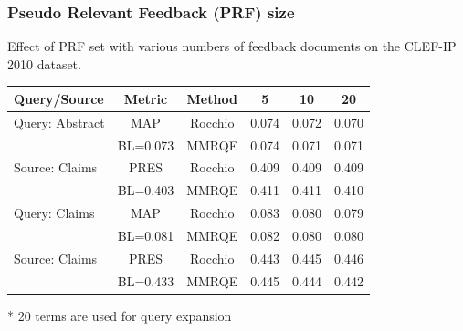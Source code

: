 \documentclass[xcolor=x11names,compress]{beamer}
\renewcommand{\(}{\begin{columns}}
\renewcommand{\)}{\end{columns}}
\newcommand{\<}[1]{\begin{column}{#1}}
\renewcommand{\>}{\end{column}}
\begin{document}
\begin{frame}
\frametitle{Pseudo Relevant Feedback (PRF) size}

Effect of PRF set with various numbers of feedback documents on the CLEF-IP 2010 dataset. 

\begin{table}
\centering{}{\scriptsize{}}%
\begin{tabular}{|l|c|c|c|c|c|}
\hline 
\textbf{\scriptsize{}Query/Source} & \textbf{\scriptsize{}Metric} & \textbf{\scriptsize{}Method} & \textbf{\scriptsize{}5} & \textbf{\scriptsize{}10} & \textbf{\scriptsize{}20}\tabularnewline
\hline 
\hline 
{\scriptsize{}Query: Abstract} & {\scriptsize{}MAP} & {\scriptsize{}Rocchio} & {\scriptsize{}0.074} & {\scriptsize{}0.072} & {\scriptsize{}0.070}\tabularnewline
\cline{3-6} 
 & {\scriptsize{}BL=0.073} & {\scriptsize{}MMRQE} & {\scriptsize{}0.074} & {\scriptsize{}0.071} & {\scriptsize{}0.071}\tabularnewline
\cline{2-6} 
{\scriptsize{}Source: Claims} & {\scriptsize{}PRES} & {\scriptsize{}Rocchio} & {\scriptsize{}0.409} & {\scriptsize{}0.409} & {\scriptsize{}0.409}\tabularnewline
\cline{3-6} 
 & \multirow{1}{*}{{\scriptsize{}BL=0.403}} & {\scriptsize{}MMRQE} & {\scriptsize{}0.411} & {\scriptsize{}0.411} & {\scriptsize{}0.410}\tabularnewline
\hline 
{\scriptsize{}Query: Claims} & {\scriptsize{}MAP} & {\scriptsize{}Rocchio} & {\scriptsize{}0.083} & {\scriptsize{}0.080} & {\scriptsize{}0.079}\tabularnewline
\cline{3-6} 
 & {\scriptsize{}BL=0.081} & {\scriptsize{}MMRQE} & {\scriptsize{}0.082} & {\scriptsize{}0.080} & {\scriptsize{}0.080}\tabularnewline
\cline{2-6} 
{\scriptsize{}Source: Claims} & {\scriptsize{}PRES} & {\scriptsize{}Rocchio} & {\scriptsize{}0.443} & {\scriptsize{}0.445} & {\scriptsize{}0.446}\tabularnewline
\cline{3-6} 
 & {\scriptsize{}BL=0.433} & {\scriptsize{}MMRQE} & {\scriptsize{}0.445} & {\scriptsize{}0.444} & {\scriptsize{}0.442}\tabularnewline
\hline 
\end{tabular}
\end{table}

* 20 terms are used for query expansion
\end{frame}
\end{document}
